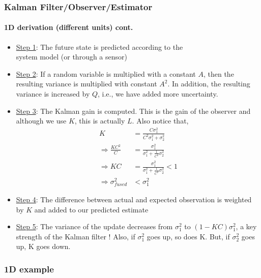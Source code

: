 \begin{frame}\pw\Large
\frametitle{Kalman Filter/Observer/Estimator}
\framesubtitle{1D derivation (different units) \tiny cont.}

\begin{itemize}\scriptsize
\item \underline{Step 1}: The future state is predicted according to the\\ system model (or through a sensor)
\item \underline{Step 2}: If a random variable is multiplied with a constant $A$, then the resulting variance is multiplied with constant $A^2$.  In addition, the resulting variance is increased by $Q$, i.e., we have added more uncertainty.
\item \underline{Step 3}: The Kalman gain is computed.  This is the gain of the observer and although we use $K$, this is actually $L$.  Also notice that,
\begin{equation*}
\begin{array}{rlllll}
K&=\frac{C\sigma_1^2}{C^2\sigma_1^2+\sigma_2^2}\\
\Rightarrow \frac{KC^2}{C}&=\frac{\sigma_1^2}{\sigma_1^2+\frac{1}{C^2}\sigma_2^2}\\
\Rightarrow KC&=\frac{\sigma_1^2}{\sigma_1^2+\frac{1}{C^2}\sigma_2^2} <1\\
\Rightarrow \sigma^2_{fused}&<\sigma^2_1
\end{array}
\end{equation*}
\item \underline{Step 4}: The difference between actual and expected observation is weighted by $K$ and added to our predicted estimate
\item \underline{Step 5}: The variance of the update decreases from $\sigma^2_1$ to $(1-KC)\sigma^2_1$, a key strength of the Kalman filter !  Also, if $\sigma^2_1$ goes up, so does K.  But, if $\sigma^2_2$ goes up, K goes down.  
\end{itemize}
\end{frame}



\subsubsection{1D example}

